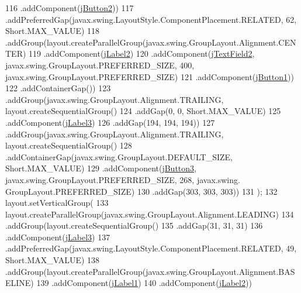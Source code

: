 \begin{DoxyCode}
116                     .addComponent(\mbox{\hyperlink{classactualizadordoxy_1_1ventana_principal_a2cf13d88ffb8e10bbc41bf5d690bd6fe}{jButton2}}))
117                 .addPreferredGap(javax.swing.LayoutStyle.ComponentPlacement.RELATED, 62, Short.MAX\_VALUE)
118                 .addGroup(layout.createParallelGroup(javax.swing.GroupLayout.Alignment.CENTER)
119                     .addComponent(\mbox{\hyperlink{classactualizadordoxy_1_1ventana_principal_af6f45a2a5f32cdee4845fcd9e66f16c8}{jLabel2}})
120                     .addComponent(\mbox{\hyperlink{classactualizadordoxy_1_1ventana_principal_a8e245eb8ef04c878fffa2f029094c142}{jTextField2}}, javax.swing.GroupLayout.PREFERRED\_SIZE, 400, 
      javax.swing.GroupLayout.PREFERRED\_SIZE)
121                     .addComponent(\mbox{\hyperlink{classactualizadordoxy_1_1ventana_principal_a9e234f123e4d11dcd43f19051065a6bd}{jButton1}}))
122                 .addContainerGap())
123             .addGroup(javax.swing.GroupLayout.Alignment.TRAILING, layout.createSequentialGroup()
124                 .addGap(0, 0, Short.MAX\_VALUE)
125                 .addComponent(\mbox{\hyperlink{classactualizadordoxy_1_1ventana_principal_a7581b585f39de6258b08299571546229}{jLabel3}})
126                 .addGap(194, 194, 194))
127             .addGroup(javax.swing.GroupLayout.Alignment.TRAILING, layout.createSequentialGroup()
128                 .addContainerGap(javax.swing.GroupLayout.DEFAULT\_SIZE, Short.MAX\_VALUE)
129                 .addComponent(\mbox{\hyperlink{classactualizadordoxy_1_1ventana_principal_a228eef1536949c06fd4cfef1fe9b97b8}{jButton3}}, javax.swing.GroupLayout.PREFERRED\_SIZE, 268, javax.swing.
      GroupLayout.PREFERRED\_SIZE)
130                 .addGap(303, 303, 303))
131         );
132         layout.setVerticalGroup(
133             layout.createParallelGroup(javax.swing.GroupLayout.Alignment.LEADING)
134             .addGroup(layout.createSequentialGroup()
135                 .addGap(31, 31, 31)
136                 .addComponent(\mbox{\hyperlink{classactualizadordoxy_1_1ventana_principal_a7581b585f39de6258b08299571546229}{jLabel3}})
137                 .addPreferredGap(javax.swing.LayoutStyle.ComponentPlacement.RELATED, 49, Short.MAX\_VALUE)
138                 .addGroup(layout.createParallelGroup(javax.swing.GroupLayout.Alignment.BASELINE)
139                     .addComponent(\mbox{\hyperlink{classactualizadordoxy_1_1ventana_principal_aa119cc780acbfdd1f1dc1fa1899136f4}{jLabel1}})
140                     .addComponent(\mbox{\hyperlink{classactualizadordoxy_1_1ventana_principal_af6f45a2a5f32cdee4845fcd9e66f16c8}{jLabel2}}))

\end{DoxyCode}
